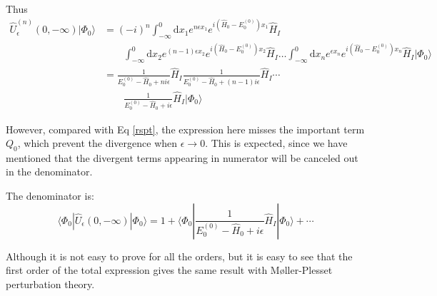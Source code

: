 Thus
\begin{equation}
	\begin{aligned}
		\hat{U}_{\epsilon}^{(n)}(0,-\infty) | \Phi_{0} \rangle&=(-i)^{n} \int_{-\infty}^{0} \mathrm{d} x_{1} e^{n \epsilon x_{1}} e^{i\left(\hat{H}_{0}-E_{0}^{(0)}\right) x_{1}} \hat{H}_{I}
		\\ 
		&\qquad {\int_{-\infty}^{0} \mathrm{d} x_{2} e^{(n-1) \epsilon x_{2}} e^{i\left(\hat{H}_{0}-E_{0}^{(0)}\right) x_{2}} \hat{H}_{I} \ldots \int_{-\infty}^{0} \mathrm{d} x_{n} e^{\epsilon x_{n}} e^{i\left(\hat{H}_{0}-E_{0}^{(0)}\right) x_{n}} \hat{H}_{I} | \Phi_{0} \rangle}
		\\
		&={\frac{1}{E_{0}^{(0)}-\hat{H}_{0}+n i \epsilon} \hat{H}_{I}}
		{\frac{1}{E_{0}^{(0)}-\hat{H}_{0}+(n-1) i \epsilon} \hat{H}_{I}} \cdots
		\\
		&\qquad \frac{1}{E_{0}^{(0)}-\hat{H}_{0}+i \epsilon} \hat{H}_{I} | \Phi_{0} \rangle
	\end{aligned}
\end{equation}

However, compared with Eq \ref{rspt}, the expression here misses the important term $Q_0$, which prevent the divergence when $\epsilon \rightarrow 0$.
This is expected, since we have mentioned that the divergent terms appearing in numerator will be canceled out in the denominator.

The denominator is:
\begin{equation}
	\langle\Phi_{0}|\hat{U}_{\epsilon}(0,-\infty)| \Phi_{0}\rangle= 1+\langle\Phi_{0}|\frac{1}{E_{0}^{(0)}-\hat{H}_{0}+i \epsilon} \hat{H}_{I}| \Phi_{0}\rangle+\cdots
\end{equation}

Although it is not easy to prove for all the orders, but it is easy to see that the first order of the total expression gives the same result with M{\o}ller-Plesset perturbation theory.


